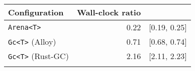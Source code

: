 \renewcommand{\arraystretch}{1.2}
\begin{tabular}{lrr}
\toprule
    Configuration & Wall-clock ratio & \\
\midrule
\addlinespace[0.4em]
\texttt{Arena<T>}          & 0.22 & \scriptsize\textcolor{gray!60}{[0.19, 0.25]} \\
\addlinespace[0.8ex]
\texttt{Gc<T>} (Alloy)     & 0.71 & \scriptsize\textcolor{gray!60}{[0.68, 0.74]} \\
\addlinespace[0.8ex]
\texttt{Gc<T>} (Rust-GC)   & 2.16 & \scriptsize\textcolor{gray!60}{[2.11, 2.23]} \\
\addlinespace[0.4em]
\bottomrule
\end{tabular}

